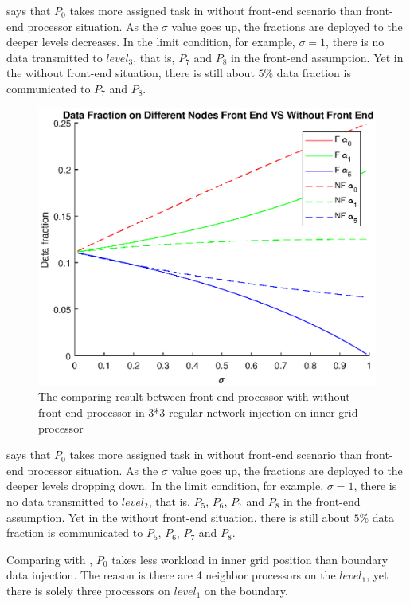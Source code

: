  says that $P_{0}$ takes more assigned task in without front-end scenario than front-end processor situation.  As the $\sigma$ value goes up, the fractions are deployed to the deeper levels decreases.  In the limit condition, for example, $\sigma  = 1$,  there is no data transmitted to $level_{3}$, that is, $P_{7}$ and $P_{8}$ in the front-end assumption.  Yet in the without front-end situation,  there is still about $5\%$ data fraction is communicated to $P_{7}$ and $P_{8}$.  

\newpage 
\begin{figure}[!ht]
\centering
\includegraphics[width=1\columnwidth]{figure/3t3i_c.eps}
\caption{The comparing result between front-end processor with without front-end processor in 3*3 regular network injection on inner grid processor }
\label{fig:3t3i_c}
\end{figure}

 says that $P_{0}$ takes more assigned task in without front-end scenario than front-end processor situation.  As the $\sigma$ value goes up, the fractions are deployed to the deeper levels dropping down.  In the limit condition, for example, $\sigma  = 1$,  there is no data transmitted to $level_{2}$, that is, $P_{5}$, $P_{6}$, $P_{7}$ and $P_{8}$ in the front-end assumption.  Yet in the without front-end situation,  there is still about $5\%$ data fraction is communicated to $P_{5}$, $P_{6}$, $P_{7}$ and $P_{8}$.  

Comparing with , $P_{0}$ takes less workload in inner grid position than boundary data injection.  The reason is there are 4 neighbor processors on the $level_{1}$, yet there is solely three processors on $level_{1}$ on the boundary.
\newpage 

